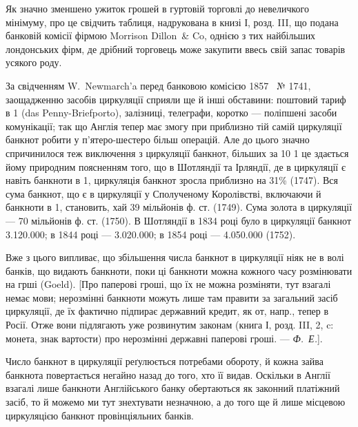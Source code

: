
Як значно зменшено ужиток грошей в гуртовій торговлі до невеличкого
мінімуму, про це свідчить таблиця, надрукована в книзі І, розд. III,
що подана банковій комісії фірмою Morrison Dillon~\& Co, однією з тих найбільших
лондонських фірм, де дрібний торговець може закупити ввесь свій запас
товарів усякого роду.

За свідченням W.~Newmarch’a перед банковою комісією 1857~ № 1741,
заощадженню засобів циркуляції сприяли ще й інші обставини: поштовий тариф
в 1 (das Penny-Briefporto), залізниці, телеграфи, коротко — поліпшені засоби
комунікації; так що Англія тепер має змогу при приблизно тій самій циркуляції
банкнот робити у п’ятеро-шестеро більш операцій. Але до цього значно
спричинилося теж виключення з циркуляції банкнот, більших за 10 1 це
здається йому природним поясненням того, що в Шотляндії та Ірляндії, де в
циркуляції є навіть банкноти в 1, циркуляція банкнот зросла приблизно
на 31\% (1747). Вся сума банкнот, що є в циркуляції у Сполученому Королівстві,
включаючи й банкноти в 1, становить, хай 39 мільйонів ф. ст.
(1749). Сума золота в циркуляції — 70 мільйонів ф. ст. (1750). В Шотляндії
в 1834 році було в циркуляції банкнот \num{3.120.000}; в 1844 році —
\num{3.020.000}; в 1854 році — \num{4.050.000} (1752).

Вже з цього випливає, що збільшення числа банкнот в циркуляції ніяк
не в волі банків, що видають банкноти, поки ці банкноти можна кожного часу
розмінювати на грші (Goeld). [Про паперові гроші, що їх не можна розміняти,
тут взагалі немає мови; нерозмінні банкноти можуть лише там правити за загальний
засіб циркуляції, де їх фактично підпирає державний кредит, як от, напр., тепер
в Росії. Отже вони підлягають уже розвинутим законам (книга І, розд. III, 2, c:
монета, знак вартости) про нерозмінні державні паперові гроші. — \emph{Ф.~Е.}].

Число банкнот в циркуляції реґулюється потребами обороту, й кожна
зайва банкнота повертається негайно назад до того, хто її видав. Оскільки в
Англії взагалі лише банкноти Англійського банку обертаються як законний
платіжний засіб, то й можемо ми тут знехтувати незначною, а до того ще й лише
місцевою циркуляцією банкнот провінціяльних банків.
